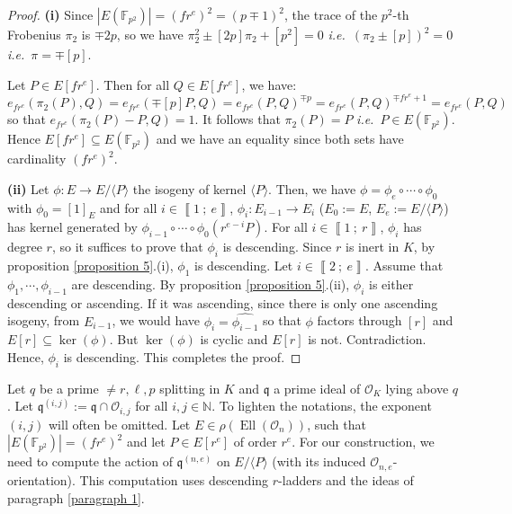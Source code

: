 \documentclass[a4paper,10pt]{report}
\theoremstyle{definition}
\theoremstyle{plain}
\theoremstyle{definition}
\newcommand{\ie}{\emph{i.e.}\ }
\newcommand{\N}{\mathbb{N}}
\newcommand{\F}{\mathbb{F}}
\newcommand{\mO}{\mathcal{O}}
\renewcommand{\i}[2]{\left\llbracket #1~;~#2\right\rrbracket}
\renewcommand{\(}{\left(}
\renewcommand{\)}{\right)}
\newcommand{\mf}[1]{\mathfrak{#1}}
\DeclareMathOperator{\Ell}{Ell}
\begin{document}
\begin{proof}
\textbf{(i)} Since $|E(\F_{p^2})|=(f r^e)^2=(p\mp 1)^2$, the trace of the $p^2$-th Frobenius $\pi_2$ is $\mp 2p$, so we have $\pi_2^2\pm [2p]\pi_2+[p^2]=0$ \ie $(\pi_2\pm[p])^2=0$ \ie $\pi=\mp[p]$. 

Let $P\in E[fr^e]$. Then for all $Q\in E[fr^e]$, we have:
\[e_{fr^e}(\pi_2(P),Q)=e_{fr^e}(\mp[p]P,Q)= e_{fr^e}(P,Q)^{\mp p}=e_{fr^e}(P,Q)^{\mp fr^e+1}=e_{fr^e}(P,Q)\]
so that $e_{fr^e}(\pi_2(P)-P,Q)=1$. It follows that $\pi_2(P)=P$ \ie $P\in E(\F_{p^2})$. Hence $E[fr^e]\subseteq E(\F_{p^2})$ and we have an equality since both sets have cardinality $(fr^e)^2$.

\textbf{(ii)} Let $\phi : E\longrightarrow E/\langle P\rangle$ the isogeny of kernel $\langle P\rangle$. Then, we have $\phi=\phi_e\circ\cdots\circ\phi_0$ with $\phi_0=[1]_E$ and for all $i\in\i{1}{e}$, $\phi_i :E_{i-1}\longrightarrow E_i$ ($E_0:=E$, $E_e:=E/\langle P\rangle$) has kernel generated by $\phi_{i-1}\circ\cdots\circ\phi_0(r^{e-i}P)$. For all $i\in\i{1}{r}$, $\phi_i$ has degree $r$, so it suffices to prove that $\phi_i$ is descending.  Since $r$ is inert in $K$, by proposition \ref{proposition 5}.(i), $\phi_1$ is descending. Let $i\in\i{2}{e}$. Assume that $\phi_1, \cdots, \phi_{i-1}$ are descending. By proposition \ref{proposition 5}.(ii), $\phi_i$ is either descending or ascending. If it was ascending, since there is only one ascending isogeny, from $E_{i-1}$, we would have $\phi_i=\widehat{\phi_{i-1}}$ so that $\phi$ factors through $[r]$ and $E[r]\subseteq \ker(\phi)$. But $\ker(\phi)$ is cyclic and $E[r]$ is not. Contradiction. Hence, $\phi_i$ is descending. This completes the proof.
\end{proof}

Let $q$ be a prime $\neq r,\ell, p$ splitting in $K$ and $\mf{q}$ a prime ideal of $\mO_K$ lying above $q$. Let $\mf{q}^{(i,j)}:=\mf{q}\cap\mO_{i,j}$ for all $i, j\in\N$. To lighten the notations, the exponent $(i,j)$ will often be omitted. Let $E\in\rho(\Ell(\mO_n))$, such that $|E(\F_{p^2})|=(f r^e)^2$ and let $P\in E[r^e]$ of order $r^e$. For our construction, we need to compute the action of $\mf{q}^{(n,e)}$ on $E/\langle P\rangle$ (with its induced $\mO_{n,e}$-orientation).  This computation uses descending $r$-ladders and the ideas of paragraph \ref{paragraph 1}.
\end{document}
